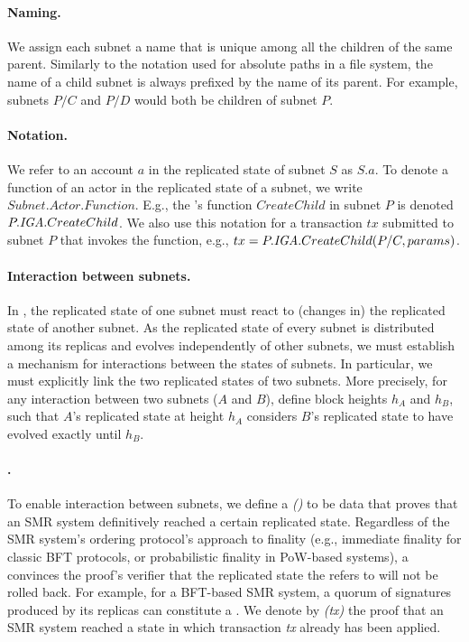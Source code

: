 \paragraph{Naming.}
We assign each subnet a name that is unique among all the children of the same parent.
Similarly to the notation used for absolute paths in a file system, the name of a child subnet is always prefixed by the name of its parent.
For example, subnets $P/C$ and $P/D$ would both be children of subnet $P$.

\paragraph{Notation.} We refer to an account $a$ in the replicated state of subnet $S$ as $S.a$.
To denote a function of an actor in the replicated state of a subnet, we write $Subnet.Actor.Function$.
E.g., the \gw's function $CreateChild$ in subnet $P$ is denoted $P.\textit{IGA}.CreateChild$.
We also use this notation for a transaction $tx$ submitted to subnet $P$ that invokes the function, e.g., $tx = P.\textit{IGA}.CreateChild(P/C, params)$.

\paragraph{Interaction between subnets.}
In \ipc, the replicated state of one subnet must react to (changes in) the replicated state of another subnet.
As the replicated state of every subnet is distributed among its replicas and evolves independently of other subnets,
we must establish a mechanism for interactions between the states of subnets.
In particular, we must explicitly link the two replicated states of two subnets.
More precisely, for any interaction between two subnets ($A$ and $B$), define block heights $h_A$ and $h_B$,
such that $A$'s replicated state at height $h_A$ considers $B$'s replicated state to have evolved exactly until $h_B$.

\paragraph{\pofsFull.}To enable interaction between subnets, we define a \emph{\pofFull (\pof)} to be data that proves that an SMR system definitively reached a certain replicated state.
Regardless of the SMR system's ordering protocol's approach to finality (e.g., immediate finality for classic BFT protocols, or probabilistic finality in PoW-based systems),
a \pof convinces the proof's verifier that the replicated state the \pof refers to will not be rolled back.
For example, for a BFT-based SMR system, a quorum of signatures produced by its replicas can constitute a \pof.
We denote by \emph{\pof(tx)} the proof that an SMR system reached a state in which transaction \emph{tx} already has been applied.


